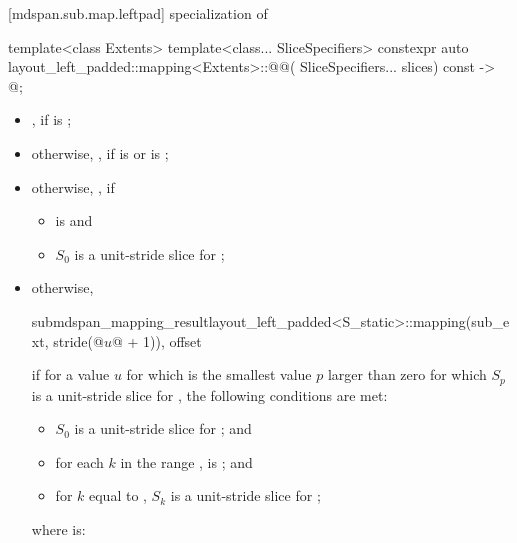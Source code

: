 [mdspan.sub.map.leftpad]{ specialization of }

%
\begin{itemdecl}
template<class Extents>
template<class... SliceSpecifiers>
constexpr auto layout_left_padded::mapping<Extents>::@@(
    SliceSpecifiers... slices) const -> @\seebelow@;
\end{itemdecl}

\begin{itemdescr}
\pnum
\returns
\begin{itemize}
\item
{},
if  is ;
\item
otherwise,
,
if  is  or
 is ;
\item
otherwise,
,
if
\begin{itemize}
\item
{} is  and
\item
$S_0$ is a unit-stride slice for ;
\end{itemize}
\item
otherwise,
\begin{codeblock}
submdspan_mapping_result{layout_left_padded<S_static>::mapping(sub_ext, stride(@$u$@ + 1)),
                         offset}
\end{codeblock}
if for a value $u$
for which  is the smallest value $p$ larger than zero
for which $S_p$ is a unit-stride slice for ,
the following conditions are met:
\begin{itemize}
\item
$S_0$ is a unit-stride slice for ; and
\item
for each $k$ in the range ,
 is ; and
\item
for $k$ equal to ,
$S_k$ is a unit-stride slice for ;
\end{itemize}
where  is:
\begin{itemize}

\end{itemize}
\end{itemize}
\end{itemdescr}

